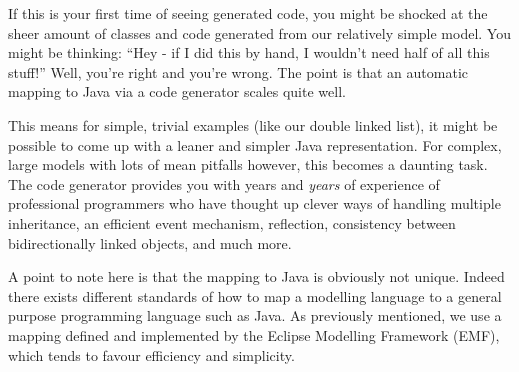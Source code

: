 If this is your first time of seeing generated code, you might be shocked at the sheer amount of classes and code generated from our relatively simple model.
You might be thinking: ``Hey - if I did this by hand, I wouldn't need half of all this stuff!''  Well, you're right and you're wrong. The point is that an
automatic mapping to Java via a code generator scales quite well.

This means for simple, trivial examples (like our double linked list), it might be possible to come up with a leaner and simpler Java representation. For
complex, large models with lots of mean pitfalls however, this becomes a daunting task.
The code generator provides you with years and \emph{years} of experience of professional programmers who have thought up clever ways of handling multiple
inheritance, an efficient event mechanism, reflection, consistency between bidirectionally linked objects, and much more.


A point to note here is that the mapping to Java is obviously not unique. Indeed there exists different standards of how to map a modelling language to a
general purpose programming language such as Java. As previously mentioned, we use a mapping defined and implemented by the Eclipse Modelling Framework (EMF),
which tends to favour efficiency and simplicity.
